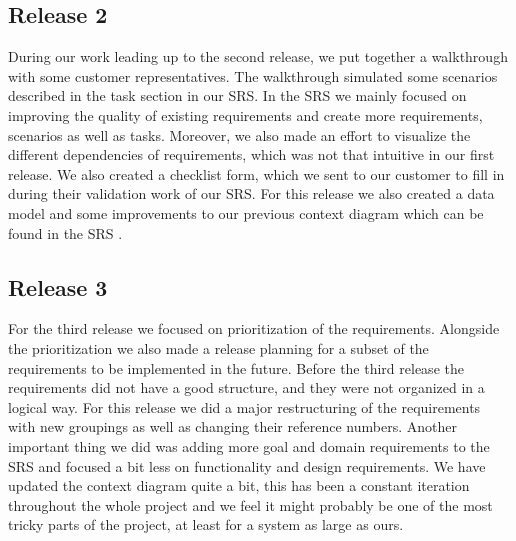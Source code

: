 \documentclass[10pt]{article}
\begin{document}
\subsection{Release 2}
During our work leading up to the second release, we put together a walkthrough with some customer representatives. The walkthrough simulated some scenarios described in the task section in our SRS. In the SRS we mainly focused on improving the quality of existing requirements and create more requirements, scenarios as well as tasks. Moreover, we also made an effort to visualize the different dependencies of requirements, which was not that intuitive in our first release. We also created a checklist form, which we sent to our customer to fill in during their validation work of our SRS. 
For this release we also created a data model and some improvements to our previous context diagram which can be found in the SRS \cite{srs}.

\subsection{Release 3}
For the third  release we focused on prioritization of the requirements. Alongside the prioritization we also made a release planning for a subset of the requirements to be implemented in the future.
Before the third release the requirements did not have a good structure, and they were not organized in a logical way. For this release we did a major restructuring of the requirements with new groupings as well as changing their reference numbers. Another important thing we did was adding more goal and domain requirements to the SRS and focused a bit less on functionality and design requirements. 
We have updated the context diagram quite a bit, this has been a constant iteration throughout the whole project and we feel it might probably be one of the most tricky parts of the project, at least for a system as large as ours.
\end{document}
